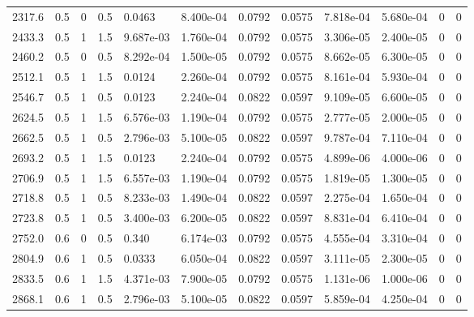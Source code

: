 \documentclass[preview]{standalone}
\begin{document}
{{\begin{tabular}{L{1.2cm}C{1.2cm} C{0.3cm}C{0.5cm} C{1.4cm}C{1.4cm} C{1.4cm}C{1.4cm} C{1.6cm}C{1.6cm} C{1.6cm}C{1.6cm}}
  2317.6  &   0.5  & 0     & 0.5 &  0.0463  & 8.400e-04  &  0.0792&   0.0575& 7.818e-04 & 5.680e-04   &  0 & 0  \\ 
  2433.3  &   0.5  & 1     & 1.5 &  9.687e-03  & 1.760e-04  &  0.0792&   0.0575& 3.306e-05 & 2.400e-05   &  0 & 0  \\ 
  2460.2  &   0.5  & 0     & 0.5 &  8.292e-04  & 1.500e-05  &  0.0792&   0.0575& 8.662e-05 & 6.300e-05   &  0 & 0  \\ 
  2512.1  &   0.5  & 1     & 1.5 &  0.0124  & 2.260e-04  &  0.0792&   0.0575& 8.161e-04 & 5.930e-04   &  0 & 0  \\ 
  2546.7  &   0.5  & 1     & 0.5 &  0.0123  & 2.240e-04  &  0.0822&   0.0597& 9.109e-05 & 6.600e-05   &  0 & 0  \\ 
  2624.5  &   0.5  & 1     & 1.5 &  6.576e-03  & 1.190e-04  &  0.0792&   0.0575& 2.777e-05 & 2.000e-05   &  0 & 0  \\ 
  2662.5  &   0.5  & 1     & 0.5 &  2.796e-03  & 5.100e-05  &  0.0822&   0.0597& 9.787e-04 & 7.110e-04   &  0 & 0  \\ 
  2693.2  &   0.5  & 1     & 1.5 &  0.0123  & 2.240e-04  &  0.0792&   0.0575& 4.899e-06 & 4.000e-06   &  0 & 0  \\ 
  2706.9  &   0.5  & 1     & 1.5 &  6.557e-03  & 1.190e-04  &  0.0792&   0.0575& 1.819e-05 & 1.300e-05   &  0 & 0  \\ 
  2718.8  &   0.5  & 1     & 0.5 &  8.233e-03  & 1.490e-04  &  0.0822&   0.0597& 2.275e-04 & 1.650e-04   &  0 & 0  \\ 
  2723.8  &   0.5  & 1     & 0.5 &  3.400e-03  & 6.200e-05  &  0.0822&   0.0597& 8.831e-04 & 6.410e-04   &  0 & 0  \\ 
  2752.0  &   0.6  & 0     & 0.5 &  0.340  & 6.174e-03  &  0.0792&   0.0575& 4.555e-04 & 3.310e-04   &  0 & 0  \\ 
  2804.9  &   0.6  & 1     & 0.5 &  0.0333  & 6.050e-04  &  0.0822&   0.0597& 3.111e-05 & 2.300e-05   &  0 & 0  \\ 
  2833.5  &   0.6  & 1     & 1.5 &  4.371e-03  & 7.900e-05  &  0.0792&   0.0575& 1.131e-06 & 1.000e-06   &  0 & 0  \\ 
  2868.1  &   0.6  & 1     & 0.5 &  2.796e-03  & 5.100e-05  &  0.0822&   0.0597& 5.859e-04 & 4.250e-04   &  0 & 0  \\ 
\hline 
\end{tabular} 

}}
\end{document}
